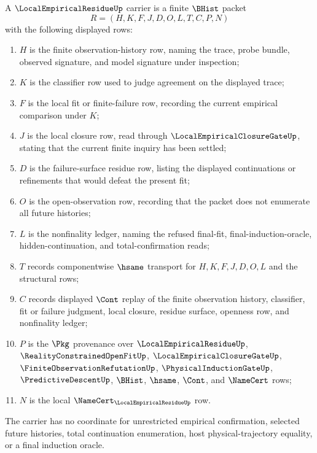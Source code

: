 \begin{definition}
\label{def:local-empirical-residue-carrier}
A $\LocalEmpiricalResidueUp$ carrier is a finite $\BHist$ packet
$$
R=(H,K,F,J,D,O,L,T,C,P,N)
$$
with the following displayed rows:
\begin{enumerate}
\item $H$ is the finite observation-history row, naming the trace, probe bundle, observed signature, and model signature under inspection;
\item $K$ is the classifier row used to judge agreement on the displayed trace;
\item $F$ is the local fit or finite-failure row, recording the current empirical comparison under $K$;
\item $J$ is the local closure row, read through $\LocalEmpiricalClosureGateUp$, stating that the current finite inquiry has been settled;
\item $D$ is the failure-surface residue row, listing the displayed continuations or refinements that would defeat the present fit;
\item $O$ is the open-observation row, recording that the packet does not enumerate all future histories;
\item $L$ is the nonfinality ledger, naming the refused final-fit, final-induction-oracle, hidden-continuation, and total-confirmation reads;
\item $T$ records componentwise $\hsame$ transport for $H,K,F,J,D,O,L$ and the structural rows;
\item $C$ records displayed $\Cont$ replay of the finite observation history, classifier, fit or failure judgment, local closure, residue surface, openness row, and nonfinality ledger;
\item $P$ is the $\Pkg$ provenance over $\LocalEmpiricalResidueUp$, $\RealityConstrainedOpenFitUp$, $\LocalEmpiricalClosureGateUp$, $\FiniteObservationRefutationUp$, $\PhysicalInductionGateUp$, $\PredictiveDescentUp$, $\BHist$, $\hsame$, $\Cont$, and $\NameCert$ rows;
\item $N$ is the local $\NameCert_{\LocalEmpiricalResidueUp}$ row.
\end{enumerate}
The carrier has no coordinate for unrestricted empirical confirmation, selected future histories, total continuation enumeration, host physical-trajectory equality, or a final induction oracle.
\end{definition}

